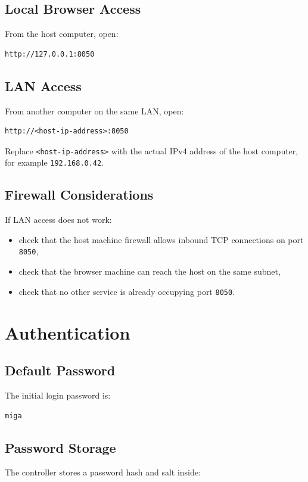 \documentclass[11pt,a4paper]{article}
\begin{document}
\subsection{Local Browser Access}
From the host computer, open:

\begin{lstlisting}[style=migacode]
http://127.0.0.1:8050
\end{lstlisting}

\subsection{LAN Access}
From another computer on the same LAN, open:

\begin{lstlisting}[style=migacode]
http://<host-ip-address>:8050
\end{lstlisting}

Replace \texttt{<host-ip-address>} with the actual IPv4 address of the host computer, for example \texttt{192.168.0.42}.

\subsection{Firewall Considerations}
If LAN access does not work:
\begin{itemize}[leftmargin=1.5em]
    \item check that the host machine firewall allows inbound TCP connections on port \texttt{8050},
    \item check that the browser machine can reach the host on the same subnet,
    \item check that no other service is already occupying port \texttt{8050}.
\end{itemize}

\section{Authentication}
\subsection{Default Password}
The initial login password is:

\begin{lstlisting}[style=migacode]
miga
\end{lstlisting}

\subsection{Password Storage}
The controller stores a password hash and salt inside:
\end{document}
